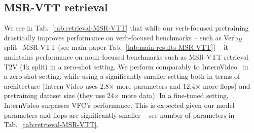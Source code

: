 \subsection{MSR-VTT retrieval}\label{subsec:app:retrieval}
We see in Tab.~\ref{tab:retrieval-MSR-VTT} that while our verb-focused pretraining drastically improves performance on verb-focused benchmarks -- such as Verb$_H$ split~\cite{park-etal-2022-exposing} MSR-VTT (see main paper Tab.~\ref{tab:main-results-MSR-VTT}) -- it maintains performance on noun-focused benchmarks such as MSR-VTT retrieval T2V (1k split) in a zero-shot setting. We perform comparably to InternVideo~\cite{wang2022internvideo} in a zero-shot setting, while using a significantly smaller setting both in terms of architecture (Intern-Video uses 2.8× more parameters and 12.4× more flops) and pretraining dataset size (they use 24× more data). In a fine-tuned setting, InternVideo surpasses VFC's performance. This is expected given our model parameters and flops are significantly smaller -- see number of parameters in Tab.~\ref{tab:retrieval-MSR-VTT}.



